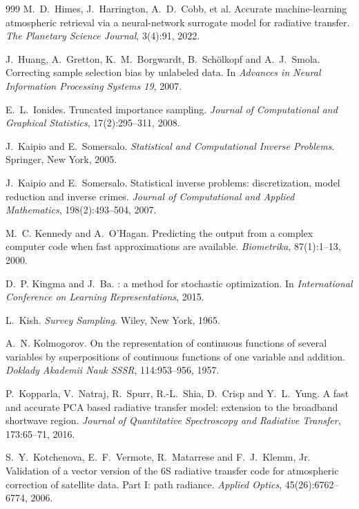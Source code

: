 \begin{thebibliography}{999}
M.~D.~Himes, J.~Harrington, A.~D.~Cobb, et al.
\newblock Accurate machine-learning atmospheric retrieval via a neural-network surrogate model for radiative transfer.
\newblock \emph{The Planetary Science Journal}, 3(4):91, 2022.

J.~Huang, A.~Gretton, K.~M.~Borgwardt, B.~Sch\"olkopf and A.~J.~Smola.
\newblock Correcting sample selection bias by unlabeled data.
\newblock In \emph{Advances in Neural Information Processing Systems 19}, 2007.

E.~L.~Ionides.
\newblock Truncated importance sampling.
\newblock \emph{Journal of Computational and Graphical Statistics}, 17(2):295--311, 2008.

J.~Kaipio and E.~Somersalo.
\newblock \emph{Statistical and Computational Inverse Problems}.
\newblock Springer, New York, 2005.

J.~Kaipio and E.~Somersalo.
\newblock Statistical inverse problems: discretization, model reduction and inverse crimes.
\newblock \emph{Journal of Computational and Applied Mathematics}, 198(2):493--504, 2007.

M.~C. Kennedy and A.~O'Hagan.
\newblock Predicting the output from a complex computer code when fast approximations are
available.
\newblock \emph{Biometrika}, 87(1):1--13, 2000.

D.~P. Kingma and J.~Ba.
: a method for stochastic optimization.
\newblock In \emph{International Conference on Learning Representations}, 2015.

L.~Kish.
\newblock \emph{Survey Sampling}.
\newblock Wiley, New York, 1965.

A.~N. Kolmogorov.
\newblock On the representation of continuous functions of several variables by superpositions
of continuous functions of one variable and addition.
\newblock \emph{Doklady Akademii Nauk SSSR}, 114:953--956, 1957.

P.~Kopparla, V.~Natraj, R.~Spurr, R.-L.~Shia, D.~Crisp and Y.~L.~Yung.
\newblock A fast and accurate PCA based radiative transfer model: extension to the broadband shortwave region.
\newblock \emph{Journal of Quantitative Spectroscopy and Radiative Transfer}, 173:65--71, 2016.

S.~Y.~Kotchenova, E.~F.~Vermote, R.~Matarrese and F.~J.~Klemm, Jr.
\newblock Validation of a vector version of the 6S radiative transfer code for atmospheric correction of satellite data. Part I: path radiance.
\newblock \emph{Applied Optics}, 45(26):6762--6774, 2006.


\end{thebibliography}
